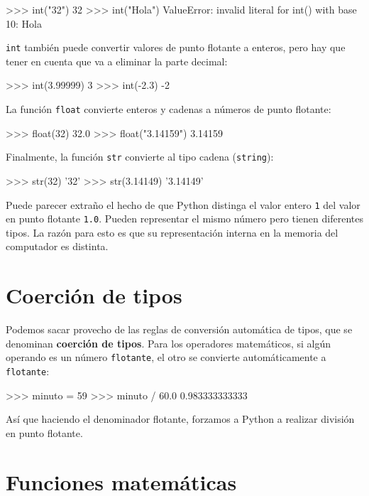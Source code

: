 \begin{pyconcode}
>>> int("32")
32
>>> int("Hola")
ValueError: invalid literal for int() with base 10: Hola
\end{pyconcode}
 \texttt{int} también puede convertir valores de punto flotante a
enteros, pero hay que tener en cuenta que va a eliminar la parte decimal:

\begin{pyconcode}
>>> int(3.99999)
3
>>> int(-2.3)
-2
\end{pyconcode}
 La función \texttt{float} convierte enteros y cadenas a números de
punto flotante:

\begin{pyconcode}
>>> float(32)
32.0
>>> float("3.14159")
3.14159
\end{pyconcode}
 Finalmente, la función \texttt{str} convierte al tipo cadena (\texttt{string}):

\begin{pyconcode}
>>> str(32)
'32'
>>> str(3.14149)
'3.14149'
\end{pyconcode}
 Puede parecer extraño el hecho de que Python distinga el valor entero
\texttt{1} del valor en punto flotante \texttt{1.0}. Pueden representar
el mismo número pero tienen diferentes tipos. La razón para esto es
que su representación interna en la memoria del computador es distinta.

\section{Coerción de tipos}

  

Podemos sacar provecho de las reglas de conversión automática de tipos,
que se denominan \textbf{coerción de tipos}. Para los operadores matemáticos,
si algún operando es un número \texttt{flotante}, el otro se convierte
automáticamente a \texttt{flotante}:

\begin{pyconcode}
>>> minuto = 59
>>> minuto / 60.0
0.983333333333
\end{pyconcode}

Así que haciendo el denominador flotante, forzamos a Python a realizar
división en punto flotante.

\section{Funciones matemáticas}

